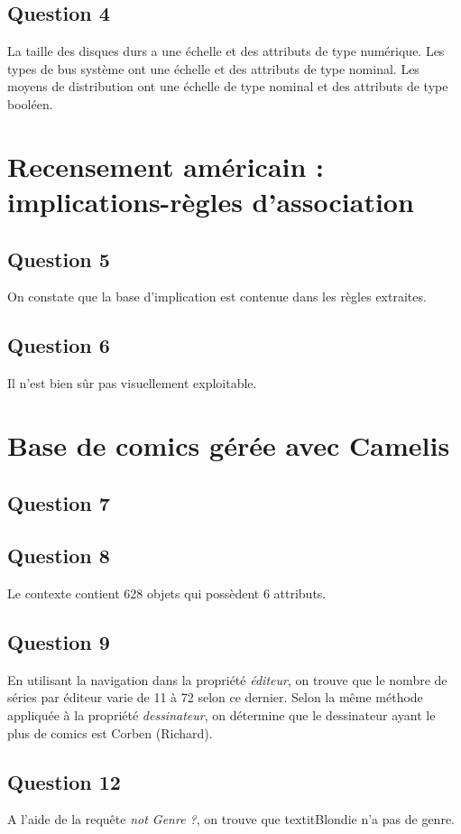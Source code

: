 \documentclass[a4paper,12pt]{article}
\begin{document}
\subsection*{Question 4}

La taille des disques durs a une échelle et des attributs de type numérique. Les types de bus système ont une échelle et des attributs de type nominal. Les moyens de distribution ont une échelle de type nominal et des attributs de type booléen.



\section{Recensement américain : implications-règles d'association}

\subsection*{Question 5}

On constate que la base d'implication est contenue dans les règles extraites.


\subsection*{Question 6}

Il n'est bien sûr pas visuellement exploitable.



\section{Base de comics gérée avec Camelis}

\subsection*{Question 7}




\subsection*{Question 8}

Le contexte contient 628 objets qui possèdent 6 attributs.


\subsection*{Question 9}

En utilisant la navigation dans la propriété \textit{éditeur}, on trouve que le nombre de séries par éditeur varie de 11 à 72 selon ce dernier.
Selon la même méthode appliquée à la propriété \textit{dessinateur}, on détermine que le dessinateur ayant le plus de comics est Corben (Richard).


\subsection*{Question 12}

A l'aide de la requête \textit{not Genre ?}, on trouve que textit{Blondie} n'a pas de genre.
\end{document}
